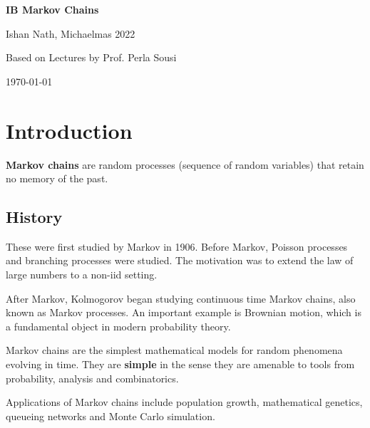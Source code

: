 \documentclass[12pt]{article}
\begin{document}
\hypersetup{pageanchor=false}
\begin{titlepage}
	\begin{center}
		\vspace*{1em}
		\Huge
		\textbf{IB Markov Chains}

		\vspace{1em}
		\large
		Ishan Nath, Michaelmas 2022

		\vspace{1.5em}

		\Large

		Based on Lectures by Prof. Perla Sousi

		\vspace{1em}

		\large
		\today
	\end{center}
	
\end{titlepage}
\hypersetup{pageanchor=true}

\tableofcontents

\newpage

\setcounter{section}{-1}

\section{Introduction}%
\label{sec:introduction}

\textbf{Markov chains} are random processes (sequence of random variables) that retain no memory of the past.

\subsection{History}%
\label{sub:history}

These were first studied by Markov in 1906. Before Markov, Poisson processes and branching processes were studied. The motivation was to extend the law of large numbers to a non-iid setting.

After Markov, Kolmogorov began studying continuous time Markov chains, also known as Markov processes. An important example is Brownian motion, which is a fundamental object in modern probability theory.

Markov chains are the simplest mathematical models for random phenomena evolving in time. They are \textbf{simple} in the sense they are amenable to tools from probability, analysis and combinatorics.

Applications of Markov chains include population growth, mathematical genetics, queueing networks and Monte Carlo simulation.
\end{document}
